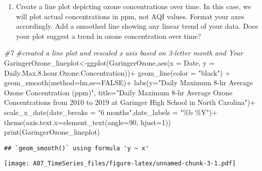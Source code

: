 \documentclass[
]{article}
\newenvironment{Shaded}{\begin{snugshade}}{\end{snugshade}}
\newcommand{\AttributeTok}[1]{\textcolor[rgb]{0.77,0.63,0.00}{#1}}
\newcommand{\CommentTok}[1]{\textcolor[rgb]{0.56,0.35,0.01}{\textit{#1}}}
\newcommand{\ConstantTok}[1]{\textcolor[rgb]{0.00,0.00,0.00}{#1}}
\newcommand{\DecValTok}[1]{\textcolor[rgb]{0.00,0.00,0.81}{#1}}
\newcommand{\FloatTok}[1]{\textcolor[rgb]{0.00,0.00,0.81}{#1}}
\newcommand{\FunctionTok}[1]{\textcolor[rgb]{0.00,0.00,0.00}{#1}}
\newcommand{\NormalTok}[1]{#1}
\newcommand{\OtherTok}[1]{\textcolor[rgb]{0.56,0.35,0.01}{#1}}
\newcommand{\SpecialCharTok}[1]{\textcolor[rgb]{0.00,0.00,0.00}{#1}}
\newcommand{\StringTok}[1]{\textcolor[rgb]{0.31,0.60,0.02}{#1}}
\providecommand{\tightlist}{%
  \setlength{\itemsep}{0pt}\setlength{\parskip}{0pt}}
\begin{document}
\begin{enumerate}
\def\labelenumi{\arabic{enumi}.}
\setcounter{enumi}{6}
\tightlist
\item
  Create a line plot depicting ozone concentrations over time. In this
  case, we will plot actual concentrations in ppm, not AQI values.
  Format your axes accordingly. Add a smoothed line showing any linear
  trend of your data. Does your plot suggest a trend in ozone
  concentration over time?
\end{enumerate}

\begin{Shaded}
\begin{Highlighting}[]
\CommentTok{\#7 \#created a line plot and rescaled x axis based on 3{-}letter month and Year }
\NormalTok{GaringerOzone\_lineplot}\OtherTok{\textless{}{-}}\FunctionTok{ggplot}\NormalTok{(GaringerOzone,}\FunctionTok{aes}\NormalTok{(}\AttributeTok{x =}\NormalTok{ Date, }
                                  \AttributeTok{y =}\NormalTok{ Daily.Max.}\FloatTok{8.}\NormalTok{hour.Ozone.Concentration))}\SpecialCharTok{+}
                        \FunctionTok{geom\_line}\NormalTok{(}\AttributeTok{color =} \StringTok{"black"}\NormalTok{) }\SpecialCharTok{+}
                        \FunctionTok{geom\_smooth}\NormalTok{(}\AttributeTok{method=}\NormalTok{lm,}\AttributeTok{se=}\ConstantTok{FALSE}\NormalTok{)}\SpecialCharTok{+}
                        \FunctionTok{labs}\NormalTok{(}\AttributeTok{y=}\StringTok{"Daily Maximum 8{-}hr Average Ozone Concentration (ppm)"}\NormalTok{,}
                             \AttributeTok{title=}\StringTok{"Daily Maximum 8{-}hr Average Ozone Concentrations from 2010 to 2019 at Garinger High School in North Carolina"}\NormalTok{)}\SpecialCharTok{+}
  \FunctionTok{scale\_x\_date}\NormalTok{(}\AttributeTok{date\_breaks =} \StringTok{"6 months"}\NormalTok{,}\AttributeTok{date\_labels =} \StringTok{"\%b \%Y"}\NormalTok{)}\SpecialCharTok{+}
  \FunctionTok{theme}\NormalTok{(}\AttributeTok{axis.text.x=}\FunctionTok{element\_text}\NormalTok{(}\AttributeTok{angle=}\DecValTok{90}\NormalTok{, }\AttributeTok{hjust=}\DecValTok{1}\NormalTok{))}
\FunctionTok{print}\NormalTok{(GaringerOzone\_lineplot)}
\end{Highlighting}
\end{Shaded}

\begin{verbatim}
## `geom_smooth()` using formula 'y ~ x'
\end{verbatim}

\texttt{[image: A07\_TimeSeries\_files/figure-latex/unnamed-chunk-3-1.pdf]}
\end{document}
